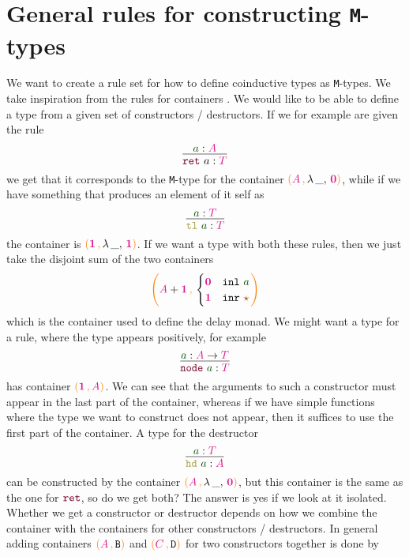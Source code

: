\documentclass[twoside,11pt,openright]{report}
\theoremstyle{plain} %
\theoremstyle{definition}
\theoremstyle{remark}
\newcommand*{\term}[1]{\textcolor{green!30!black}{#1}} %
\newcommand*{\type}[1]{\textcolor{magenta!90!black}{#1}}
\newcommand*{\containerpair}[2]{\ensuremath{\colorlet{savedleftcolor}{.}\color{orange}\left(\color{savedleftcolor}#1\,\textcolor{orange}{\mathbf{,}}\,#2\color{orange}\right)\color{savedleftcolor}}}
\newcommand*{\containerpairsimple}[2]{\containerpair{#1}{\lambda\,\_,\,#2}}
\newcommand*{\unit}{\type{\textbf{1}}}
\newcommand*{\empt}{\type{\textbf{0}}}
\newcommand*{\constant}[1]{\textcolor{orange!60!black}{\ensuremath{\mathtt{#1}}}}
\newcommand*{\constructor}[1]{\textcolor{purple!60!black}{\ensuremath{\mathtt{#1}}}}
\newcommand*{\destructor}[1]{\textcolor{yellow!60!black}{\ensuremath{\mathtt{#1}}}}
\newcommand*{\typeformer}[1]{\ensuremath{\mathtt{#1}}}
\newcommand*{\unitelem}{\constant{\star}} %
\begin{document}
\section{General rules for constructing \texttt{M}-types}
We want to create a rule set for how to define coinductive types as \texttt{M}-types. We take inspiration from the rules for containers \cite{DBLP:DiffContainer}\cite{ContainerRules}. We would like to be able to define a type from a given set of constructors / destructors. If we for example are given the rule
\begin{equation}
  \vcenter{\infer{\constructor{ret}~a : \type{T}}{\term{a} : \type{A}}}
\end{equation}
we get that it corresponds to the \texttt{M}-type for the container \(\containerpairsimple{\type{A}}{\empt}\), while if we have something that produces an element of it self as
\begin{equation}
  \vcenter{\infer{\destructor{tl}~\term{a} : \type{T}}{\term{a} : \type{T}}}
\end{equation}
the container is \(\containerpairsimple{\unit}{\unit}\). If we want a type with both these rules, then we just take the disjoint sum of the two containers
\begin{equation}
  \containerpair{\type{A} + \unit}{\begin{cases} \empt & \mathtt{inl}~\term{a} \\ \unit & \mathtt{inr}~\unitelem \end{cases}}
\end{equation}
which is the container used to define the delay monad. We might want a type for a rule, where the type appears positively, for example
\begin{equation}
  \vcenter{\infer{\constructor{node}~\term{a} : \type{T}}{\term{a} : \type{A} \rightarrow \type{T}}}
\end{equation}
has container \(\containerpair{\unit}{\type{A}}\). We can see that the arguments to such a constructor must appear in the last part of the container, whereas if we have simple functions where the type we want to construct does not appear, then it suffices to use the first part of the container. A type for the destructor
\begin{equation}
  \vcenter{\infer{\destructor{hd}~\term{a} : \type{A}}{\term{a} : \type{T}}}
\end{equation}
can be constructed by the container \(\containerpairsimple{\type{A}}{\empt}\), but this container is the same as the one for \(\constructor{ret}\), so do we get both? The answer is yes if we look at it isolated. Whether we get a constructor or destructor depends on how we combine the container with the containers for other constructors / destructors. In general adding containers \(\containerpair{\type{A}}{\typeformer{B}}\) and \(\containerpair{\type{C}}{\typeformer{D}}\) for two constructors together is done by
\end{document}
